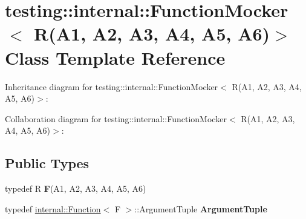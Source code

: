 \hypertarget{classtesting_1_1internal_1_1FunctionMocker_3_01R_07A1_00_01A2_00_01A3_00_01A4_00_01A5_00_01A6_08_4}{}\section{testing\+:\+:internal\+:\+:Function\+Mocker$<$ R(A1, A2, A3, A4, A5, A6)$>$ Class Template Reference}
\label{classtesting_1_1internal_1_1FunctionMocker_3_01R_07A1_00_01A2_00_01A3_00_01A4_00_01A5_00_01A6_08_4}


Inheritance diagram for testing\+:\+:internal\+:\+:Function\+Mocker$<$ R(A1, A2, A3, A4, A5, A6)$>$\+:


Collaboration diagram for testing\+:\+:internal\+:\+:Function\+Mocker$<$ R(A1, A2, A3, A4, A5, A6)$>$\+:
\subsection*{Public Types}
\begin{DoxyCompactItemize}
\item 
\mbox{\label{classtesting_1_1internal_1_1FunctionMocker_3_01R_07A1_00_01A2_00_01A3_00_01A4_00_01A5_00_01A6_08_4_a5373cd66051f0a54e83b0497004df058}} 
typedef R {\bfseries F}(A1, A2, A3, A4, A5, A6)
\item 
\mbox{\label{classtesting_1_1internal_1_1FunctionMocker_3_01R_07A1_00_01A2_00_01A3_00_01A4_00_01A5_00_01A6_08_4_a0c8bc671adc8e67e8a49a01432407139}} 
typedef \hyperlink{structtesting_1_1internal_1_1Function}{internal\+::\+Function}$<$ F $>$\+::Argument\+Tuple {\bfseries Argument\+Tuple}
\end{DoxyCompactItemize}
